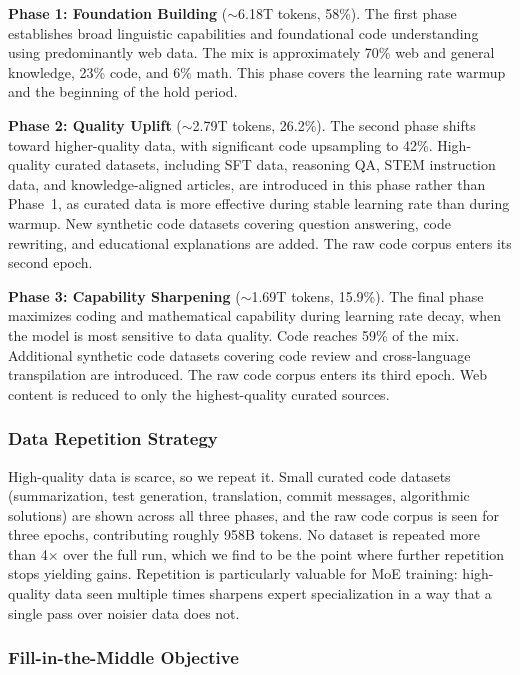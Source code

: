 \documentclass[11pt,a4paper]{article}
\begin{document}
\textbf{Phase 1: Foundation Building} (${\sim}$6.18T tokens, 58\%). The first phase
establishes broad linguistic capabilities and foundational code understanding
using predominantly web data. The mix is approximately 70\% web and general
knowledge, 23\% code, and 6\% math. This phase covers the learning rate warmup
and the beginning of the hold period.

\textbf{Phase 2: Quality Uplift} (${\sim}$2.79T tokens, 26.2\%). The second phase
shifts toward higher-quality data, with significant code upsampling to 42\%.
High-quality curated datasets, including SFT data, reasoning QA, STEM
instruction data, and knowledge-aligned articles, are introduced in this
phase rather than Phase~1, as curated data is more effective during stable
learning rate than during warmup. New synthetic code datasets covering
question answering, code rewriting, and educational explanations are added.
The raw code corpus enters its second epoch.

\textbf{Phase 3: Capability Sharpening} (${\sim}$1.69T tokens, 15.9\%). The final
phase maximizes coding and mathematical capability during learning rate decay,
when the model is most sensitive to data quality. Code reaches 59\% of the mix.
Additional synthetic code datasets covering code review and cross-language
transpilation are introduced. The raw code corpus enters its third epoch.
Web content is reduced to only the highest-quality curated sources.

\subsubsection{Data Repetition Strategy}

High-quality data is scarce, so we repeat it. Small curated code datasets
(summarization, test generation, translation, commit messages, algorithmic
solutions) are shown across all three phases, and the raw code corpus is seen
for three epochs, contributing roughly 958B tokens. No dataset is repeated
more than 4$\times$ over the full run, which we find to be the point where
further repetition stops yielding gains. Repetition is particularly valuable
for MoE training: high-quality data seen multiple times sharpens expert
specialization in a way that a single pass over noisier data does not.

\subsubsection{Fill-in-the-Middle Objective}
\label{sec:fim}
\end{document}
